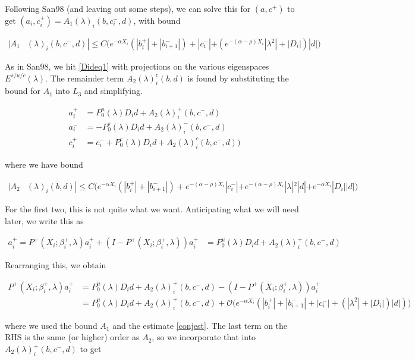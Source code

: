 \documentclass[12pt]{article}
\begin{document}
Following San98 (and leaving out some steps), we can solve this for $(a, c^+)$ to get $(a_i, c_i^+) = A_1(\lambda)_i(b, c_i^-, d)$, with bound

\begin{align*}
|A_1&(\lambda)_i(b, c^-, d)|
\leq C \Big( e^{-\alpha X_i} (|b_i^+| + |b_{i+1}^-|) + |c_i^-| + (e^{-(\alpha - \rho) X_i} |\lambda^2| + |D_i|)|d| \Big)
\end{align*} 

As in San98, we hit \eqref{Dideq1} with projections on the various eigenspaces $E^{s/u/c}(\lambda)$. The remainder term $A_2(\lambda)_i^c(b, d)$ is found by substituting the bound for $A_1$ into $L_3$ and simplifying.

\begin{align*}
a_i^+ &= P_0^u(\lambda) D_i d + A_2(\lambda)_i^+(b, c^-, d) \\
a_i^- &= -P_0^s(\lambda) D_i d + A_2(\lambda)_i^-(b, c^-, d) \\
c_i^+ &= c_i^- + P_0^c(\lambda) D_i d + A_2(\lambda)_i^c(b, c^-, d) )
\end{align*}

where we have bound

\begin{align*}
|A_2&(\lambda)_i(b, d)|
\leq C \Big( e^{-\alpha X_i} (|b_i^+| + |b_{i+1}^-|) + e^{-(\alpha - \rho) X_i} |c_i^-| + e^{-(\alpha - \rho) X_i} |\lambda|^2|d| + e^{-\alpha X_i} |D_i||d| \Big)
\end{align*} 

For the first two, this is not quite what we want. Anticipating what we will need later, we write this as

\begin{align*}
a_i^+ = P^+(X_i; \beta_i^+, \lambda)a_i^+ + (I - P^+(X_i; \beta_i^+, \lambda))a_i^+ &= P_0^u(\lambda) D_i d + A_2(\lambda)_i^+(b, c^-, d)
\end{align*}

Rearranging this, we obtain

\begin{align*}
P^+(X_i; \beta_i^+, \lambda)a_i^+ &= P_0^u(\lambda) D_i d + A_2(\lambda)_i^+(b, c^-, d) - (I - P^+(X_i; \beta_i^+, \lambda))a_i^+ \\
&= P_0^u(\lambda) D_i d + A_2(\lambda)_i^+(b, c^-, d) + \mathcal{O}\Big( e^{-\alpha X_i} (|b_i^+| + |b_{i+1}^-| + |c_i^-| + (|\lambda^2| + |D_i|)|d|)\Big)
\end{align*}

where we used the bound $A_1$ and the estimate \eqref{conjest}. The last term on the RHS is the same (or higher) order as $A_2$, so we incorporate that into $A_2(\lambda)_i^+(b, c^-, d)$ to get
\end{document}
